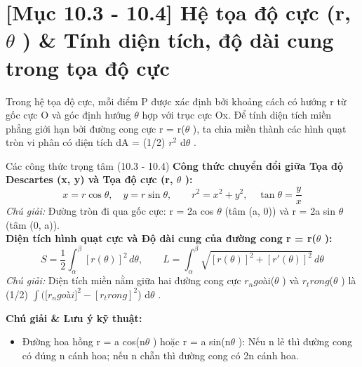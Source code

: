 \documentclass[11pt,a4paper,oneside]{book}
\begin{document}
\section{[Mục 10.3 - 10.4] Hệ tọa độ cực (r, $\theta$ ) \& Tính diện tích, độ dài cung trong tọa độ cực}
Trong hệ tọa độ cực, mỗi điểm P được xác định bởi khoảng cách có hướng r từ gốc cực O và góc định hướng $\theta$  hợp với trục cực Ox. Để tính diện tích miền phẳng giới hạn bởi đường cong cực r = r($\theta$ ), ta chia miền thành các hình quạt tròn vi phân có diện tích dA = (1/2) $r^2$ d$\theta$ .

\begin{congthuc}{Các công thức trọng tâm (10.3 - 10.4)}
\noindent\textbf{Công thức chuyển đổi giữa Tọa độ Descartes (x, y) và Tọa độ cực (r, $\theta$ ):}
\[ x = r\cos\theta, \quad y = r\sin\theta, \qquad r^2 = x^2 + y^2, \quad \tan\theta = \frac{y}{x} \]
\noindent\textit{Chú giải:} Đường tròn đi qua gốc cực: r = 2a cos $\theta$  (tâm (a, 0)) và r = 2a sin $\theta$  (tâm (0, a)).\\[4pt]
\noindent\textbf{Diện tích hình quạt cực và Độ dài cung của đường cong r = r($\theta$ ):}
\[ S = \frac{1}{2} \int_\alpha^\beta [r(\theta)]^2\,d\theta, \qquad L = \int_\alpha^\beta \sqrt{[r(\theta)]^2 + [r'(\theta)]^2}\,d\theta \]
\noindent\textit{Chú giải:} Diện tích miền nằm giữa hai đường cong cực $r_ngo$ài($\theta$ ) và $r_trong$($\theta$ ) là (1/2) $\int ([r_ngo$à$i]^2 - [r_trong]^2$) d$\theta$ .\\[4pt]
\end{congthuc}

\noindent\textbf{Chú giải \& Lưu ý kỹ thuật:}
\begin{itemize}[leftmargin=1.5em, itemsep=2pt]
  \item Đường hoa hồng r = a cos(n$\theta$ ) hoặc r = a sin(n$\theta$ ): Nếu n lẻ thì đường cong có đúng n cánh hoa; nếu n chẵn thì đường cong có 2n cánh hoa.
\end{itemize}
\end{document}
